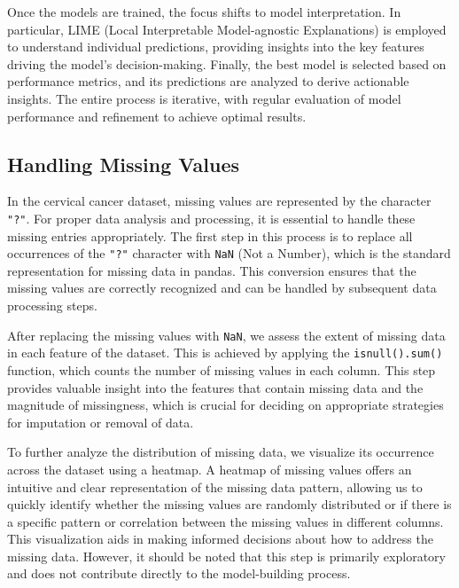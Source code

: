 \documentclass{llncs}
\begin{document}

Once the models are trained, the focus shifts to model interpretation. In particular, LIME (Local Interpretable Model-agnostic Explanations) is employed to understand individual predictions, providing insights into the key features driving the model's decision-making. Finally, the best model is selected based on performance metrics, and its predictions are analyzed to derive actionable insights. The entire process is iterative, with regular evaluation of model performance and refinement to achieve optimal results.


\subsection{Handling Missing Values}

In the cervical cancer dataset, missing values are represented by the character \texttt{"?"}. For proper data analysis and processing, it is essential to handle these missing entries appropriately. The first step in this process is to replace all occurrences of the \texttt{"?"} character with \texttt{NaN} (Not a Number), which is the standard representation for missing data in pandas. This conversion ensures that the missing values are correctly recognized and can be handled by subsequent data processing steps.

After replacing the missing values with \texttt{NaN}, we assess the extent of missing data in each feature of the dataset. This is achieved by applying the \texttt{isnull().sum()} function, which counts the number of missing values in each column. This step provides valuable insight into the features that contain missing data and the magnitude of missingness, which is crucial for deciding on appropriate strategies for imputation or removal of data.

To further analyze the distribution of missing data, we visualize its occurrence across the dataset using a heatmap. A heatmap of missing values offers an intuitive and clear representation of the missing data pattern, allowing us to quickly identify whether the missing values are randomly distributed or if there is a specific pattern or correlation between the missing values in different columns. This visualization aids in making informed decisions about how to address the missing data. However, it should be noted that this step is primarily exploratory and does not contribute directly to the model-building process.
\end{document}
